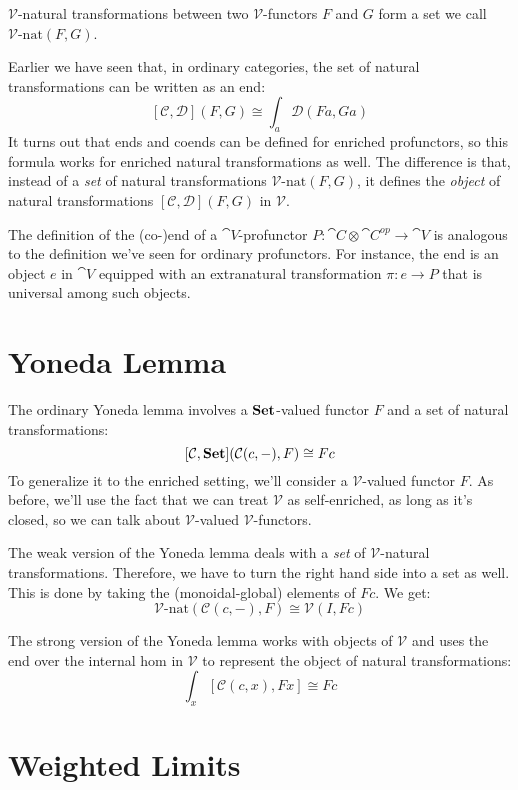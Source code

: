 \documentclass[DaoFP]{subfiles}
\begin{document}
$\mathcal V$-natural transformations between two $\mathcal V$-functors $F$ and $G$ form a set we call $\mathcal V\text{-nat} (F, G)$. 

Earlier we have seen that, in ordinary categories, the set of natural transformations can be written as an end:
\[ [\mathcal C, \mathcal D](F, G) \cong \int_a \mathcal D(F a, G a) \]
It turns out that ends and coends can be defined for enriched profunctors, so this formula works for enriched natural transformations as well. The difference is that, instead of a \emph{set} of natural transformations $\mathcal V\text{-nat} (F, G)$, it defines the \emph{object} of natural transformations $[\mathcal C, \mathcal D](F, G)$ in $\mathcal V$. 

The definition of the (co-)end of a $\cat V$-profunctor $P \colon \cat C \otimes \cat C^{op} \to \cat V$ is analogous to the definition we've seen for ordinary profunctors. For instance, the end is an object $e$ in $\cat V$ equipped with an extranatural transformation $\pi \colon e \to P$ that is universal among such objects. 

\section{Yoneda Lemma}

The ordinary Yoneda lemma involves a $\mathbf{Set}$-valued functor $F$ and a set of natural transformations:
\[ [\mathcal C, \mathbf{Set}]( \mathcal C(c, -), F) \cong F c \]
To generalize it to the enriched setting, we'll consider a $\mathcal V$-valued functor $F$. As before, we'll use the fact that we can treat $\mathcal V$ as self-enriched, as long as it's closed, so we can talk about $\mathcal V$-valued $\mathcal V$-functors. 

The weak version of the Yoneda lemma deals with a \emph{set} of $\mathcal V$-natural transformations. Therefore, we have to turn the right hand side into a set as well. This is done by taking the (monoidal-global) elements of $F c$. We get:
\[ \mathcal V\text{-nat} ( \mathcal C(c, -), F) \cong \mathcal V(I, F c) \]

The strong version of the Yoneda lemma works with objects of $\mathcal V$ and uses the end over the internal hom in $\mathcal V$ to represent the object of natural transformations:
\[ \int_x [\mathcal C( c, x), F x] \cong F c \]

\section{Weighted Limits}
\end{document}
